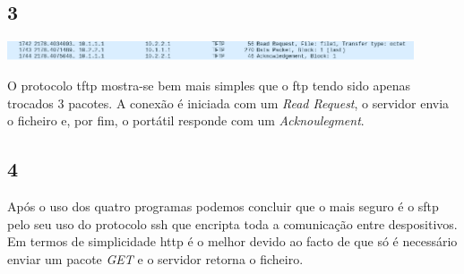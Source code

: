 \documentclass{article}
\begin{document}
        \subsection*{3}
            {
                \centering
                \includegraphics[width=12cm]{images/tftp-wireshark.png}
                \par
            }
                O protocolo tftp mostra-se bem mais simples que o ftp tendo sido apenas trocados 3 pacotes.
            A conexão é iniciada com um \textit{Read Request}, o servidor envia o ficheiro e, por fim, o portátil responde com um \textit{Acknoulegment}.
        \subsection*{4}
                Após o uso dos quatro programas podemos concluir que o mais seguro é o sftp pelo seu uso do protocolo ssh que encripta toda a comunicação entre despositivos.
            Em termos de simplicidade http é o melhor devido ao facto de que só é necessário enviar um pacote \textit{GET} e o servidor retorna o ficheiro.
\end{document}

